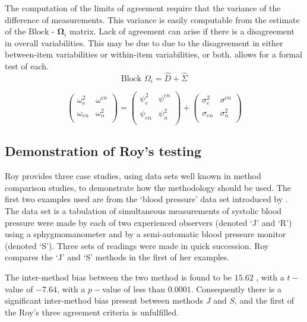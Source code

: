 \documentclass[12pt, a4paper]{report}
\theoremstyle{plain}
\theoremstyle{definition}
\theoremstyle{remark}
\begin{document}
The computation of the limits of agreement require that the variance of the difference of measurements. This variance is easily computable from the estimate of the ${\mbox{Block - }\boldsymbol \Omega_{i}}$ matrix. Lack of agreement can arise if there is a disagreement in overall variabilities. This may be due to due to the disagreement in either between-item
variabilities or within-item variabilities, or both. \citet{ARoy2009} allows for a formal test of each.
\begin{equation}
\mbox{Block  }\Omega_{i} = \hat{D} + \hat{\Sigma}
\end{equation}

\begin{equation}
\left( \begin{array}{cc}
\omega^2_{e} & \omega^{en} \\
\omega_{en} & \omega^2_{n} \\
\end{array}\right)
=
\left( \begin{array}{cc}
\psi^2_{e} & \psi^{en} \\
\psi_{en} & \psi^2_{n} \\
\end{array}\right)
+
\left( \begin{array}{cc}
\sigma^2_{e} & \sigma^{en} \\
\sigma_{en} & \sigma^2_{n} \\
\end{array}\right)
\end{equation}





\subsection{Demonstration of Roy's testing}
Roy provides three case studies, using data sets well known in method comparison studies, to demonstrate how the methodology should be used. The first two examples used are from the `blood pressure' data set introduced by \citet{BA99}. The data set is a tabulation of simultaneous measurements of systolic blood pressure were made by each of two experienced observers (denoted `J' and `R') using a sphygmomanometer and by a semi-automatic blood pressure monitor (denoted `S'). Three sets of readings were made in quick succession. Roy compares the `J' and `S' methods in the first of her examples.

The inter-method bias between the two method is found to be $15.62$ , with a $t-$value of $-7.64$, with a $p-$value of less than $0.0001$. Consequently there is a significant inter-method bias present between methods $J$ and $S$, and the first of the Roy's three agreement criteria is unfulfilled.
\end{document}
